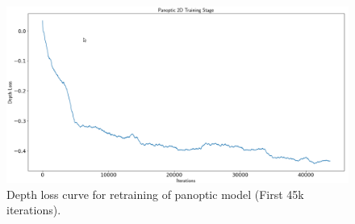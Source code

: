 \begin{figure}[h]
  \centering
  \includegraphics[width=\linewidth]{figs/depthloss.png}
  \caption{Depth loss curve for retraining of panoptic model (First 45k iterations).}
  \label{subfig:additional}
  \vspace*{-3mm} %
\end{figure}
